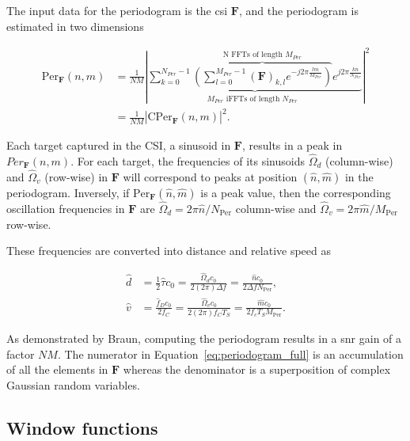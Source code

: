     The input data for the periodogram is the \gls{csi} $\mathbf F$, and the periodogram is estimated in two dimensions

    \begin{equation}
    	\label{eq:periodogram_full}
    	\begin{aligned}
    		\text{Per}_{\mathbf F}(n,m) &= \frac{1}{NM} \left| \underbrace{ \sum_{k=0}^{N_{Per}-1}  \overbrace{\left(  \sum_{l=0}^{M_{Per}-1} (\mathbf F)_{k,l} e^{-j2\pi \frac{lm}{M_{Per}}} \right)}^{\text{N FFTs of length $M_{Per}$}}  e^{j2\pi\frac{kn}{N_{Per}}}}_{ \text{$M_{Per}$ iFFTs of length $N_{Per}$ }} \right| ^ 2 \\
    		&= \frac{1}{NM} \left| \text{CPer}_{\mathbf F}(n,m) \right| ^ 2.
    	\end{aligned}
    \end{equation}


    Each target captured in the CSI, \ie a sinusoid in $\mathbf F$, results in a peak in $Per_{\mathbf F}(n,m)$.
    For each target, the frequencies of its sinusoids $\hat{\Omega}_d$ (column-wise) and $\hat{\Omega}_v$ (row-wise) in $\mathbf F$ will correspond to peaks at position $(\hat{n}, \hat{m})$ in the periodogram. Inversely, if $\text{Per}_{\bm{F}}(\hat{n},\hat{m})$ is a peak value, then the corresponding oscillation frequencies in $\mathbf F$ are $\hat{\Omega}_d = 2\pi\hat{n}/N_{\text{Per}}$ column-wise and $\hat{\Omega}_v = 2\pi\hat{m}/M_{\text{Per}}$ row-wise.
    
    These frequencies are converted into distance and relative speed as

    \begin{align*}
        \hat{d} &= \frac{1}{2}\hat{\tau}c_0 = \frac{\hat{\Omega}_d c_0}{2 (2\pi) \Delta f} = \frac{\hat{n}c_0}{2\Delta f N_\text{Per}}, \\
        \hat{v} &= \frac{\hat{f}_D c_0 }{2 f_C} = \frac{\hat{\Omega}_v c_0}{2(2\pi)f_CT_S} =  \frac{\hat{m}c_0}{2f_cT_S M_{\text{Per}}}.
    \end{align*}
    
    
    

    As demonstrated by Braun, computing the periodogram results in a \gls{snr} gain of a factor $NM$. The numerator in Equation~\eqref{eq:periodogram_full} is an accumulation of all the elements in $\mathbf F$ whereas the denominator is a superposition of complex Gaussian random variables.
    
	\subsection{Window functions}
	
